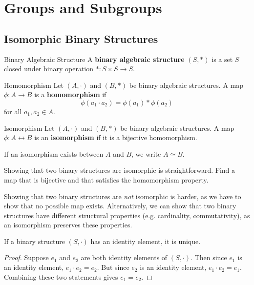 \documentclass[10pt]{report}
\begin{document}
\tableofcontents


\chapter{Groups and Subgroups}


\section{Isomorphic Binary Structures}

\begin{defn}{Binary Algebraic Structure}{}
	A \textbf{binary algebraic structure} $(S, *)$ is a set $S$ closed under binary operation $* : S \times S \to S$.
\end{defn}

\begin{defn}{Homomorphism}{}
	Let $(A, \cdot)$ and $(B,*)$ be binary algebraic structures. A map $\phi:A \to B$ is a \textbf{homomorphism} if
	\[
		\phi(a_1 \cdot a_2) = \phi(a_1) * \phi(a_2)
	\] for all $a_1, a_2 \in A$.
\end{defn}

\begin{defn}{Isomorphism}{}
Let $(A, \cdot)$ and $(B,*)$ be binary algebraic structures. A map $\phi:A \leftrightarrow B$ is an \textbf{isomorphism} if it is a bijective homomorphism.

If an isomorphism exists between $A$ and $B$, we write $A \simeq B$.
\end{defn}

Showing that two binary structures are isomorphic is straightforward. Find a map that is bijective and that satisfies the homomorphism property.

Showing that two binary structures are \textit{not} isomorphic is harder, as we have to show that no possible map exists. Alternatively, we can show that two binary structures have different structural properties (e.g. cardinality, commutativity), as an isomorphism preserves these properties.

\begin{prop}
	If a binary structure $(S, \cdot)$ has an identity element, it is unique.
\end{prop}
\begin{proof}
	Suppose $e_1$ and $e_2$ are both identity elements of $(S, \cdot)$. Then since $e_1$ is an identity element, $e_1 \cdot e_2 = e_2$. But since $e_2$ is an identity element, $e_1 \cdot e_2 = e_1$. Combining these two statements gives $e_1=e_2$.
\end{proof}
\end{document}
